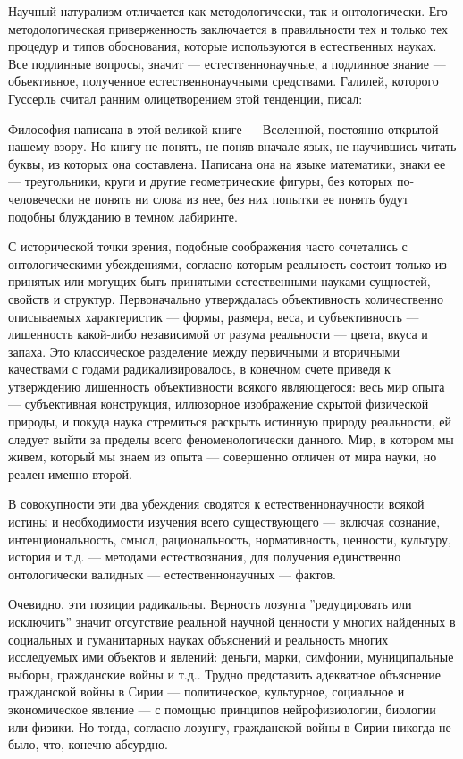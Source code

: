 \documentclass[11pt]{book}
\begin{document}
Научный натурализм отличается как методологически, так и онтологически. Его методологическая приверженность заключается в правильности тех и только тех процедур и типов обоснования, которые используются в естественных науках. Все подлинные вопросы, значит --- естественнонаучные, а подлинное знание --- объективное, полученное естественнонаучными средствами. Галилей, которого Гуссерль считал ранним олицетворением этой тенденции, писал:

\smallskip
{}\relax
{}\relax

Философия написана в этой великой книге --- Вселенной, постоянно открытой нашему взору. Но книгу не понять, не поняв вначале язык, не научившись читать буквы, из которых она составлена. Написана она на языке математики, знаки ее --- треугольники, круги и другие геометрические фигуры, без которых по-человечески не понять ни слова из нее, без них попытки ее понять будут подобны блужданию в темном лабиринте.

\relax
{}\relax
\smallskip

С исторической точки зрения, подобные соображения часто сочетались с онтологическими убеждениями, согласно которым реальность состоит только из принятых или могущих быть принятыми естественными науками сущностей, свойств и структур. Первоначально утверждалась объективность количественно описываемых характеристик --- формы, размера, веса, и субъективность --- лишенность какой-либо независимой от разума реальности --- цвета, вкуса и запаха. Это классическое разделение между первичными и вторичными качествами с годами радикализировалось, в конечном счете приведя к утверждению лишенность объективности всякого являющегося: весь мир опыта --- субъективная конструкция, иллюзорное изображение скрытой физической природы, и покуда наука стремиться раскрыть истинную природу реальности, ей следует выйти за пределы всего феноменологически данного. Мир, в котором мы живем, который мы знаем из опыта --- совершенно отличен от мира науки, но реален именно второй.

В совокупности эти два убеждения сводятся к естественнонаучности всякой истины и необходимости изучения всего существующего --- включая сознание, интенциональность, смысл, рациональность, нормативность, ценности, культуру, история и т.д. --- методами естествознания, для получения единственно онтологически валидных --- естественнонаучных --- фактов.

Очевидно, эти позиции радикальны. Верность лозунга ''редуцировать или исключить'' значит отсутствие реальной научной ценности у многих найденных в социальных и гуманитарных науках объяснений и реальность многих исследуемых ими объектов и явлений: деньги, марки, симфонии, муниципальные выборы, гражданские войны и т.д.. Трудно представить адекватное объяснение гражданской войны в Сирии --- политическое, культурное, социальное и экономическое явление --- с помощью принципов нейрофизиологии, биологии или физики. Но тогда, согласно лозунгу, гражданской войны в Сирии никогда не было, что, конечно абсурдно.
\end{document}
